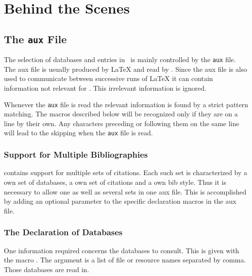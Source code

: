 
\chapter{Behind the Scenes}

\section{The \texttt{aux} File}


 The selection of databases and entries in \ExBib\ is mainly
controlled by the \texttt{aux} file. The aux file is usually produced
by \LaTeX{} and read by \ExBib. Since the aux file
is also used to communicate between successive runs of
\LaTeX{} it can contain information not relevant for
\ExBib. This irrelevant information is ignored.

Whenever the \texttt{aux} file is read the relevant information is
found by a strict pattern matching. The macros described below will be
recognized only if they are on a line by their own. Any characters
preceding or following them on the same line will lead to the
skipping when the \texttt{aux} file is read.

\subsection{Support for Multiple Bibliographies}

\ExBib contains support for multiple sets of citations. Each such set
is characterized by a own set of databases, a own set of citations and
a own bib style. Thus it is necessary to allow one as well as several
sets in one aux file. This is accomplished by adding an optional
parameter to the specific declaration macros in the aux file.


\subsection{The Declaration of Databases}

One information required concerns the databases to consult. This is
given with the macro . The argument is a list of file
or resource names separated by comma. Those databases are read in.

